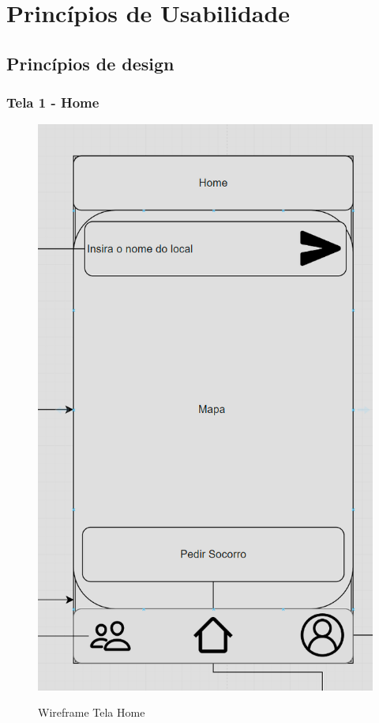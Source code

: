 \chapter{Princípios de Usabilidade}
\section{Princípios de design}
\subsection{Tela 1 - Home}
\begin{figure}[h]
  \begin{center}
  \includegraphics[width=0.5\linewidth]{images/wire-tela-home.png}\\
  \end{center}
  \caption[Wireframe Tela Home]{Wireframe Tela Home}
  \label{fig:wireframe-tela-home}
\end{figure}
\clearpage
